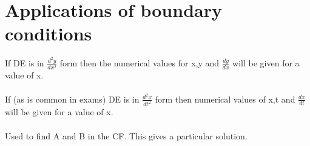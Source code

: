 \documentclass{article}[18pt]
\begin{document}
\section{Applications of boundary conditions}
If DE is in $\frac{d^2y}{dx^2}$ form then the numerical values for x,y and $\frac{dy}{dx}$ will be given for a value of x.\\
\\
If (as is common in exams) DE is in $\frac{d^2x}{dt^2}$ form then numerical values of x,t and $\frac{dx}{dt}$ will be given for a value of x.\\
\\
Used to find A and B in the CF. This gives a particular solution.
\end{document}
